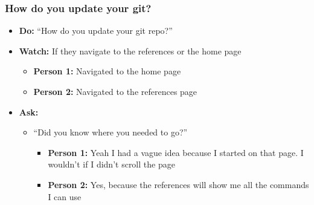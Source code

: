 \subsubsection{How do you update your git?}
\begin{itemize}
	\item\textbf{Do:} ``How do you update your git repo?''
	\item\textbf{Watch:} If they navigate to the references or the home page
	\begin{itemize}
		\item\textbf{Person 1:} Navigated to the home page
		\item\textbf{Person 2:} Navigated to the references page	
	\end{itemize}
	\item\textbf{Ask:}
	\begin{itemize}
		\item ``Did you know where you needed to go?''
		\begin{itemize}
			\item\textbf{Person 1:} Yeah I had a vague idea because I started on that page. I wouldn't if I didn't scroll the page
			\item\textbf{Person 2:} Yes, because the references will show me all the commands I can use
		\end{itemize}
	\end{itemize}	
\end{itemize}

